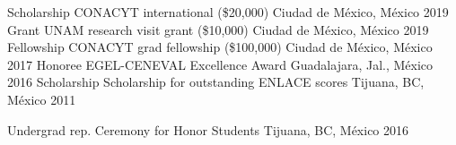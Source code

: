 \vspace{-5mm}
\begin{minipage}[t]{0.5\textwidth}
\begin{center}
\begin{cvhonors}
    \cvhonor
    {Scholarship}
    {CONACYT \textendash{} international (\approx\$20,000)}
    {Ciudad de México, México}
    {2019}
    \cvhonor
    {Grant}
    {UNAM research visit grant (\approx\$10,000)}
    {Ciudad de México, México}
    {2019}
    \cvhonor
    {Fellowship}
    {CONACYT grad fellowship (\approx\$100,000)}
    {Ciudad de México, México}
    {2017}
  \cvhonor
    {Honoree}
    {EGEL-CENEVAL Excellence Award}
    {Guadalajara, Jal., México}
    {2016}
  \cvhonor
    {Scholarship}
    {Scholarship for outstanding ENLACE scores}
    {Tijuana, BC, México}
    {2011}
\end{cvhonors}
\end{center}
\end{minipage}
\begin{minipage}[t]{0.5\textwidth}
\begin{center}
\begin{cvhonors}
  \cvhonor
    {Undergrad rep.}
    {Ceremony for Honor Students}
    {Tijuana, BC, México}
    {2016}
\end{cvhonors}
\end{center}
\end{minipage}
